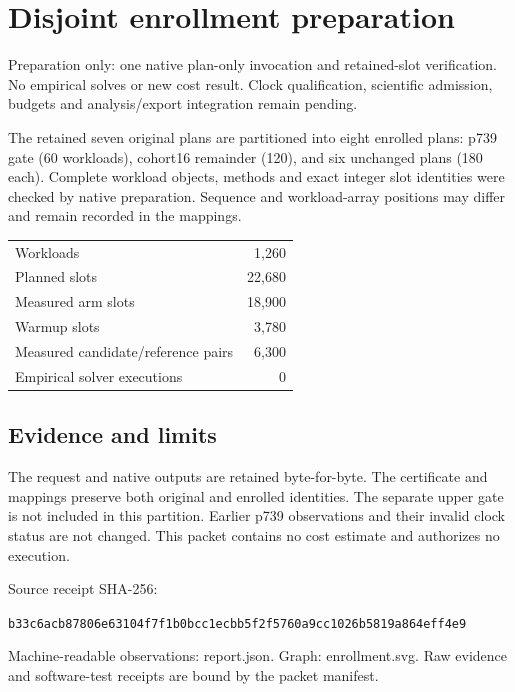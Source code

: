 \documentclass{article}
\begin{document}
\section*{Disjoint enrollment preparation}
Preparation only: one native plan-only invocation and retained-slot verification. No empirical solves or new cost result. Clock qualification, scientific admission, budgets and analysis/export integration remain pending.\par
The retained seven original plans are partitioned into eight enrolled plans: p739 gate (60 workloads), cohort16 remainder (120), and six unchanged plans (180 each). Complete workload objects, methods and exact integer slot identities were checked by native preparation. Sequence and workload-array positions may differ and remain recorded in the mappings.\par
\begin{center}\begin{tabular}{lr}Workloads & 1,260\\Planned slots & 22,680\\Measured arm slots & 18,900\\Warmup slots & 3,780\\Measured candidate/reference pairs & 6,300\\Empirical solver executions & 0\end{tabular}\end{center}
\subsection*{Evidence and limits}
The request and native outputs are retained byte-for-byte. The certificate and mappings preserve both original and enrolled identities. The separate upper gate is not included in this partition. Earlier p739 observations and their invalid clock status are not changed. This packet contains no cost estimate and authorizes no execution.\par
Source receipt SHA-256:\par\texttt{\small b33c6acb87806e63104f7f1b0bcc1ecbb5f2f5760a9cc1026b5819a864eff4e9}\par
Machine-readable observations: report.json. Graph: enrollment.svg. Raw evidence and software-test receipts are bound by the packet manifest.
\end{document}
